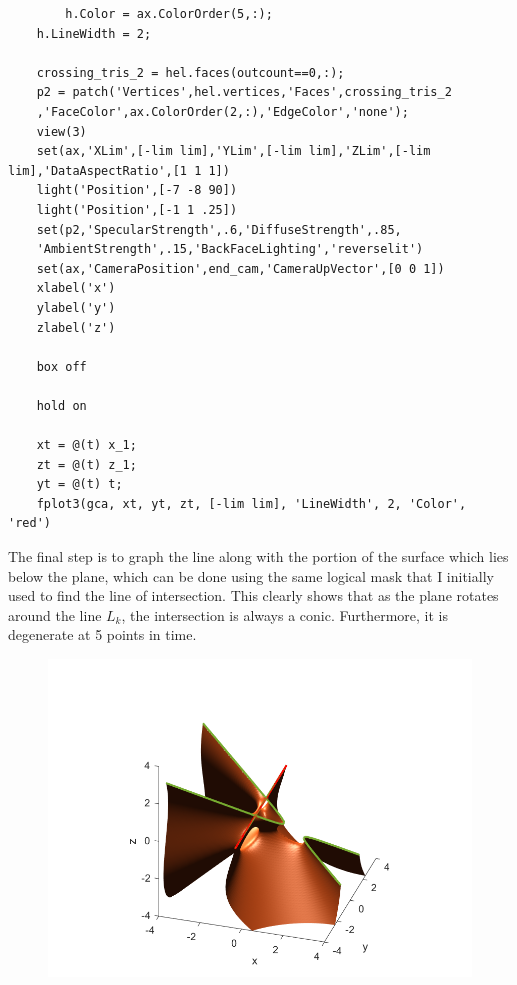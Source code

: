 \documentclass{article}
\begin{document}
	\begin{verbatim}
	    h.Color = ax.ColorOrder(5,:);
    h.LineWidth = 2;

    crossing_tris_2 = hel.faces(outcount==0,:);
    p2 = patch('Vertices',hel.vertices,'Faces',crossing_tris_2
    ,'FaceColor',ax.ColorOrder(2,:),'EdgeColor','none');
    view(3)
    set(ax,'XLim',[-lim lim],'YLim',[-lim lim],'ZLim',[-lim lim],'DataAspectRatio',[1 1 1])
    light('Position',[-7 -8 90])
    light('Position',[-1 1 .25])
    set(p2,'SpecularStrength',.6,'DiffuseStrength',.85,
    'AmbientStrength',.15,'BackFaceLighting','reverselit')
    set(ax,'CameraPosition',end_cam,'CameraUpVector',[0 0 1])
    xlabel('x')
    ylabel('y')
    zlabel('z')

    box off

    hold on

    xt = @(t) x_1;
    zt = @(t) z_1;
    yt = @(t) t;
    fplot3(gca, xt, yt, zt, [-lim lim], 'LineWidth', 2, 'Color', 'red')
    \end{verbatim}
	The final step is to graph the line along with the portion of the surface which lies below the plane, which can be done using the same logical mask that I initially used to find the line of intersection. This clearly shows that as the plane rotates around the line $L_k$, the intersection is always a conic. Furthermore, it is degenerate at 5 points in time. 
	
	\newpage
	\begin{figure}[h!]
		\centering
		\includegraphics[scale=0.50]{graphing_end_result.png}
		\label{km1_final_fig}
	\end{figure}
\end{document}
